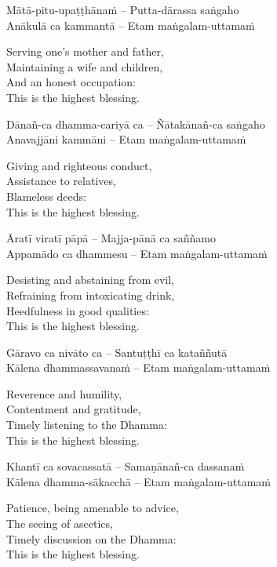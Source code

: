Mātā-pitu-upaṭṭhānaṁ – Putta-dārassa saṅgaho\\
Anākulā ca kammantā – Etam maṅgalam-uttamaṁ

\begin{english}
  Serving one's mother and father,\\
  Maintaining a wife and children,\\
  And an honest occupation:\\
  This is the highest blessing.
\end{english}

Dānañ-ca dhamma-cariyā ca – Ñātakānañ-ca saṅgaho\\
Anavajjāni kammāni – Etam maṅgalam-uttamaṁ

\begin{english}
  Giving and righteous conduct,\\
  Assistance to relatives,\\
  Blameless deeds:\\
  This is the highest blessing.
\end{english}

Āratī viratī pāpā – Majja-pānā ca saññamo\\
Appamādo ca dhammesu – Etam maṅgalam-uttamaṁ

\begin{english}
  Desisting and abstaining from evil,\\
  Refraining from intoxicating drink,\\
  Heedfulness in good qualities:\\
  This is the highest blessing.
\end{english}

Gāravo ca nivāto ca – Santuṭṭhī ca kataññutā\\
Kālena dhammassavanaṁ – Etam maṅgalam-uttamaṁ

\begin{english}
  Reverence and humility,\\
  Contentment and gratitude,\\
  Timely listening to the Dhamma:\\
  This is the highest blessing.
\end{english}

Khantī ca sovacassatā – Samaṇānañ-ca dassanaṁ\\
Kālena dhamma-sākacchā – Etam maṅgalam-uttamaṁ

\begin{english}
  Patience, being amenable to advice,\\
  The seeing of ascetics,\\
  Timely discussion on the Dhamma:\\
  This is the highest blessing.
\end{english}

